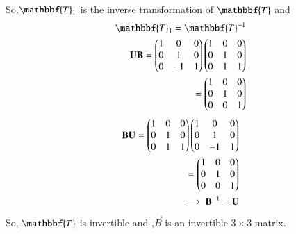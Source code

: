 \documentclass[journal,12pt,twocolumn]{IEEEtran}
\begin{document}
     So,$\mathbbf{T}_1$ is the inverse transformation of $\mathbbf{T}$ and
     \begin{align}
     \mathbbf{T}_1=\mathbbf{T}^{-1}\\
     \vec{U}\vec{B}=\myvec{1&0&0\\0&1&0\\0&-1&1}\myvec{1&0&0\\0&1&0\\0&1&1}\\
     =\myvec{1&0&0\\0&1&0\\0&0&1}
     \end{align}
     \begin{align}
     \mathbf{B}\mathbf{U}=\begin{pmatrix}1&0&0\\0&1&0\\0&1&1\end{pmatrix}\begin{pmatrix}1&0&0\\0&1&0\\0&-1&1\end{pmatrix}\\=\begin{pmatrix}1&0&0\\0&1&0\\0&0&1\end{pmatrix}\\
     \implies \mathbf{B}^{-1}=\mathbf{U}
\end{align}
So, $\mathbbf{T}$ is invertible and ,$\vec{B}$ is an invertible $3 \times 3$ matrix.
\end{document}
